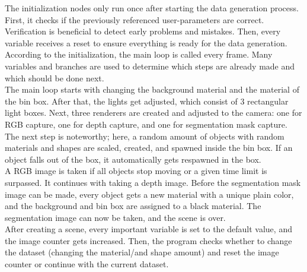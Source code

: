 		The initialization nodes only run once after starting the data generation process. First, it checks if the previously referenced user-parameters are correct. Verification is beneficial to detect early problems and mistakes. Then, every variable receives a reset to ensure everything is ready for the data generation. %
		According to the initialization, the main loop is called every frame. Many variables and branches are used to determine which steps are already made and which should be done next.\\
		The main loop starts with changing the background material and the material of the bin box. After that, the lights get adjusted, which consist of 3 rectangular light boxes. Next, three renderers are created and adjusted to the camera: one for RGB capture, one for depth capture, and one for segmentation mask capture. The next step is noteworthy; here, a random amount of objects with random materials and shapes are scaled, created, and spawned inside the bin box. If an object falls out of the box, it automatically gets respawned in the box. \\
		A RGB image is taken if all objects stop moving or a given time limit is surpassed. It continues with taking a depth image. Before the segmentation mask image can be made, every object gets a new material with a unique plain color, and the background and bin box are assigned to a black material. The segmentation image can now be taken, and the scene is over.\\ %
		After creating a scene, every important variable is set to the default value, and the image counter gets increased. Then, the program checks whether to change the dataset (changing the material/and shape amount) and reset the image counter or continue with the current dataset. \\%
